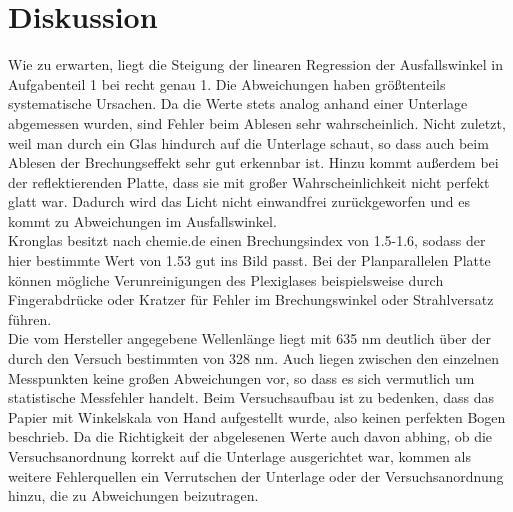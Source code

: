 \section{Diskussion}
\label{sec:Diskussion}

Wie zu erwarten, liegt die Steigung der linearen Regression der Ausfallswinkel in Aufgabenteil 1 bei 
recht genau 1. Die Abweichungen haben größtenteils systematische Ursachen. Da die Werte stets analog 
anhand einer Unterlage abgemessen wurden, sind Fehler beim Ablesen sehr wahrscheinlich.
Nicht zuletzt, weil man durch ein Glas hindurch auf die Unterlage schaut, so dass auch beim Ablesen
der Brechungseffekt sehr gut erkennbar ist. Hinzu kommt außerdem bei der reflektierenden 
Platte, dass sie mit großer Wahrscheinlichkeit nicht perfekt glatt war. Dadurch wird das 
Licht nicht einwandfrei zurückgeworfen und es kommt zu Abweichungen im Ausfallswinkel. \\
 
Kronglas besitzt nach chemie.de einen Brechungsindex von 1.5-1.6, sodass der hier bestimmte Wert von 
1.53 gut ins Bild passt. Bei der Planparallelen Platte können mögliche Verunreinigungen des 
Plexiglases beispielsweise durch Fingerabdrücke oder Kratzer für Fehler im Brechungswinkel oder 
Strahlversatz führen. \\

Die vom Hersteller angegebene Wellenlänge liegt mit 635 nm deutlich über der durch den Versuch 
bestimmten von 328 nm. Auch liegen zwischen den einzelnen Messpunkten keine großen Abweichungen 
vor, so dass es sich vermutlich um statistische Messfehler handelt. Beim Versuchsaufbau ist 
zu bedenken, dass das Papier mit Winkelskala von Hand aufgestellt wurde, also keinen perfekten 
Bogen beschrieb. Da die Richtigkeit der abgelesenen Werte auch davon abhing, ob die Versuchsanordnung
korrekt auf die Unterlage ausgerichtet war, kommen als weitere Fehlerquellen ein Verrutschen
der Unterlage oder der Versuchsanordnung hinzu, die zu Abweichungen beizutragen.\\
